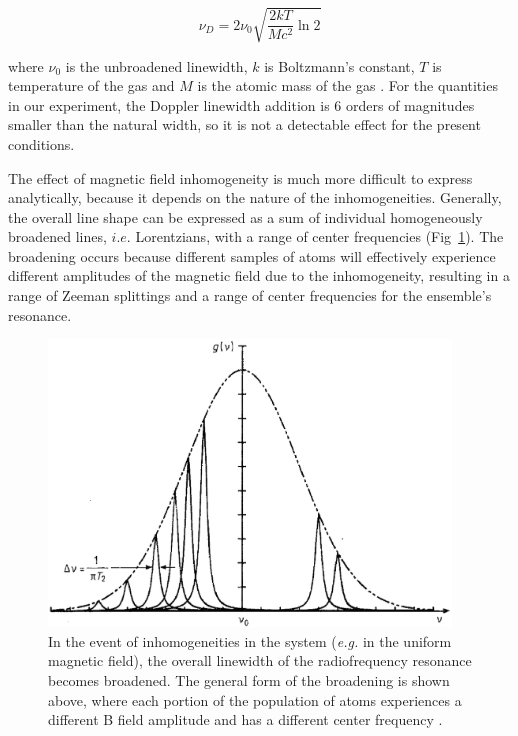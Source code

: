\begin{equation}
\nu_D = 2\nu_0\sqrt{\frac{2 k T}{M c^2}\ln{2}}
\end{equation}

where $\nu_0$ is the unbroadened linewidth, $k$ is Boltzmann's
constant, $T$ is temperature of the gas and $M$ is the atomic mass of
the gas \cite{yariv}. For the quantities in our experiment, the
Doppler linewidth addition is $6$ orders of magnitudes smaller than
the natural width, so it is not a detectable effect for the present
conditions.

The effect of magnetic field inhomogeneity is much more difficult to
express analytically, because it depends on the nature of the
inhomogeneities. Generally, the overall line shape can be expressed as
a sum of individual homogeneously broadened lines, $i.e.$ Lorentzians,
with a range of center frequencies
(Fig~\ref{fig:inhomo})\cite{vanier}. The broadening occurs because
different samples of atoms will effectively experience different
amplitudes of the magnetic field due to the inhomogeneity,
resulting in a range of Zeeman splittings and a range of center
frequencies for the ensemble's resonance.

\begin{figure}[h]
\begin{center}
\includegraphics[height=3in]{figures/inhomogeneous.eps}
\caption{\small{In the event of inhomogeneities in the system (\emph{e.g.} in the uniform magnetic field), the overall linewidth of the radiofrequency resonance becomes broadened. The general form of the broadening is shown above, where each portion of the population of atoms experiences a different B field amplitude and has a different center frequency \cite{vanier}.}}
\label{fig:inhomo}
\end{center}
\end{figure}